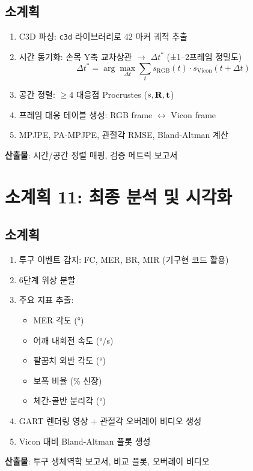 \documentclass[11pt, a4paper]{report}
\begin{document}
\subsection{소계획}
\begin{pipelinebox}[title={SP-10: Vicon 검증 파이프라인}]
\begin{enumerate}
\item C3D 파싱: \texttt{c3d} 라이브러리로 42 마커 궤적 추출
\item 시간 동기화: 손목 Y축 교차상관 $\to$ $\Delta t^*$ (±1--2프레임 정밀도)
  \[
  \Delta t^* = \arg\max_{\Delta t} \sum_t s_{\text{RGB}}(t) \cdot s_{\text{Vicon}}(t + \Delta t)
  \]
\item 공간 정렬: $\geq$4 대응점 Procrustes ($s, \mathbf{R}, \mathbf{t}$)
\item 프레임 대응 테이블 생성: RGB frame $\leftrightarrow$ Vicon frame
\item MPJPE, PA-MPJPE, 관절각 RMSE, Bland-Altman 계산
\end{enumerate}
\textbf{산출물}: 시간/공간 정렬 매핑, 검증 메트릭 보고서
\end{pipelinebox}


\section{소계획 11: 최종 분석 및 시각화}
\label{sec:sp11}

\subsection{소계획}
\begin{pipelinebox}[title={SP-11: 투구 생체역학 결과 분석}]
\begin{enumerate}
\item 투구 이벤트 감지: FC, MER, BR, MIR (기구현 코드 활용)
\item 6단계 위상 분할
\item 주요 지표 추출:
  \begin{itemize}
  \item MER 각도 (°)
  \item 어깨 내회전 속도 (°/s)
  \item 팔꿈치 외반 각도 (°)
  \item 보폭 비율 (\% 신장)
  \item 체간-골반 분리각 (°)
  \end{itemize}
\item GART 렌더링 영상 + 관절각 오버레이 비디오 생성
\item Vicon 대비 Bland-Altman 플롯 생성
\end{enumerate}
\textbf{산출물}: 투구 생체역학 보고서, 비교 플롯, 오버레이 비디오
\end{pipelinebox}
\end{document}
